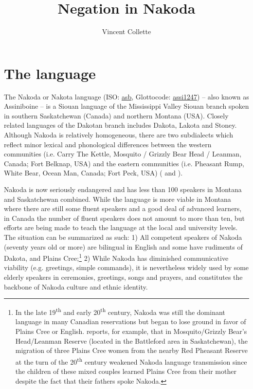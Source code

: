 \documentclass[output=paper,colorlinks,citecolor=brown]{langscibook}
\author{Vincent Collette\affiliation{Université du Québec à Chicoutimi}}
\title{Negation in Nakoda}
\begin{document}
\maketitle 

\section{The language}\label{sec:nak:1}

The Nakoda or Nakota language (ISO: \href{https://iso639-3.sil.org/code/asb}{asb}, Glottocode: \href{https://glottolog.org/resource/languoid/id/assi1247}{assi1247}) -- also known as Assiniboine -- is a Siouan language of the Mississippi Valley Siouan branch spoken in southern Saskatchewan (Canada) and northern Montana (USA). Closely related languages of the Dakotan branch includes Dakota, Lakota and Stoney. Although Nakoda is relatively homogeneous, there are two subdialects which reflect minor lexical and phonological differences between the western communities (i.e. Carry The Kettle, Mosquito / Grizzly Bear Head / Leanman, Canada; Fort Belknap, USA) and the eastern communities (i.e. Pheasant Rump, White Bear, Ocean Man, Canada; Fort Peck, USA) (\citealt{ParksDeMallie1992} and \citealt{Collette2022}). 

Nakoda is now seriously endangered and has less than 100 speakers in Montana and Saskatchewan combined. While the language is more viable in Montana where there are still some fluent speakers and a good deal of advanced learners, in Canada the number of fluent speakers does not amount to more than ten, but efforts are being made to teach the language at the local and university levels. The situation can be summarized as such: 1) All competent speakers of Nakoda (seventy years old or more) are bilingual in English and some have rudiments of Dakota, and Plains Cree;\footnote{In the late 19\textsuperscript{th} and early 20\textsuperscript{th} century, Nakoda was still the dominant language in many Canadian reservations but began to lose ground in favor of Plains Cree or English. \citet[447]{McLeod2000} reports, for example, that in Mosquito/Grizzly Bear’s Head/Leanman Reserve (located in the Battleford area in Saskatchewan), the migration of three Plains Cree women from the nearby Red Pheasant Reserve at the turn of the 20\textsuperscript{th} century weakened Nakoda language transmission since the children of these mixed couples learned Plains Cree from their mother despite the fact that their fathers spoke Nakoda.} 2) While Nakoda has diminished communicative viability (e.g. greetings, simple commands), it is nevertheless widely used by some elderly speakers in ceremonies, greetings, songs and prayers, and constitutes the backbone of Nakoda culture and ethnic identity. 
\end{document}
